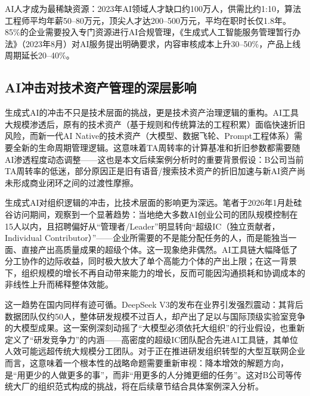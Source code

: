 AI人才成为最稀缺资源：2023年AI领域人才缺口约100万人，供需比约1:10，算法工程师平均年薪50--80万元，顶尖人才达200--500万元，平均在职时长仅1.8年\cite{zhilian2024ai}。85\%的企业需要投入专门资源进行AI合规管理，《生成式人工智能服务管理暂行办法》（2023年8月）对AI服务提出明确要求，内容审核成本上升30--50\%，产品上线周期延长20--40\%\cite{idc2024genai,cyberspace2023genai}。

\subsection{AI冲击对技术资产管理的深层影响}

生成式AI的冲击不只是技术层面的挑战，更是技术资产治理逻辑的重构。AI工具大规模渗透后，原有的技术资产（基于规则和传统算法的工程积累）面临快速折旧风险，而新一代AI Native的技术资产（大模型、数据飞轮、Prompt工程体系）需要全新的生命周期管理逻辑。这意味着TA周转率的计算基准和折旧参数都需要随AI渗透程度动态调整——这也是本文后续案例分析时的重要背景假设：B公司当前TA周转率的低迷，部分原因正是旧有语音/搜索技术资产的折旧加速与新AI资产尚未形成商业闭环之间的过渡性摩擦。

生成式AI对组织逻辑的冲击，比技术层面的影响更为深远。笔者于2026年1月赴硅谷访问期间，观察到一个显著趋势：当地绝大多数AI创业公司的团队规模控制在15人以内，且招聘偏好从“管理者/Leader”明显转向“超级IC（独立贡献者，Individual Contributor）”——企业所需要的不是能分配任务的人，而是能独当一面、直接产出高质量成果的超级个体。这一现象绝非偶然。AI工具链大幅降低了分工协作的边际收益，同时极大放大了单个高能力个体的产出上限；在这一背景下，组织规模的增长不再自动带来能力的增长，反而可能因沟通损耗和协调成本的非线性上升而稀释整体效能。

这一趋势在国内同样有迹可循。DeepSeek V3的发布在业界引发强烈震动：其背后数据团队仅约50人，整体研发规模不过百人，却产出了足以与国际顶级实验室竞争的大模型成果。这一案例深刻动摇了“大模型必须依托大组织”的行业假设，也重新定义了“研发竞争力”的内涵——高密度的超级IC团队配合先进AI工具链，其单位人效可能远超传统大规模分工团队。对于正在推进研发组织转型的大型互联网企业而言，这意味着一个根本性的战略命题需要重新审视：降本增效的解题方向，是“用更少的人做更多的事”，而非“用更多的人分摊更细的任务”。这对B公司等传统大厂的组织范式构成的挑战，将在后续章节结合具体案例深入分析。

